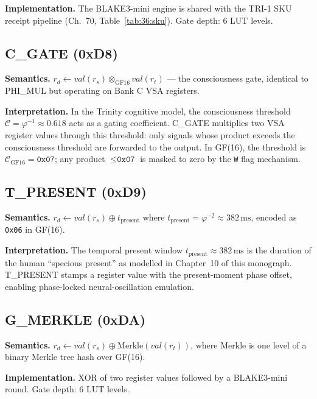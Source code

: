 \textbf{Implementation.} The BLAKE3-mini engine is shared with the
TRI-1 SKU receipt pipeline (Ch.~70, Table~\ref{tab:36:sku}).
Gate depth: 6 LUT levels.

\subsection{C\_GATE (0xD8)}
\label{subsec:71:c-gate}

\textbf{Semantics.} $r_d \leftarrow \mathit{val}(r_s) \otimes_{\mathrm{GF16}}
\mathit{val}(r_t)$ — the consciousness gate, identical to PHI\_MUL
but operating on Bank C VSA registers.

\textbf{Interpretation.} In the Trinity cognitive model, the
consciousness threshold $\mathcal{C} = \varphi^{-1} \approx 0.618$
acts as a gating coefficient.  C\_GATE multiplies two VSA register
values through this threshold: only signals whose product exceeds the
consciousness threshold are forwarded to the output.  In GF(16), the
threshold is $\mathcal{C}_{\mathrm{GF16}} = \texttt{0x07}$; any product
$\le \texttt{0x07}$ is masked to zero by the \texttt{W} flag mechanism.

\subsection{T\_PRESENT (0xD9)}
\label{subsec:71:t-present}

\textbf{Semantics.} $r_d \leftarrow \mathit{val}(r_s) \oplus
t_{\mathrm{present}}$ where $t_{\mathrm{present}} = \varphi^{-2} \approx 382\,\text{ms}$,
encoded as \texttt{0x06} in GF(16).

\textbf{Interpretation.} The temporal present window
$t_{\mathrm{present}} \approx 382\,\text{ms}$ is the duration of the
human ``specious present'' as modelled in Chapter~10 of this
monograph.  T\_PRESENT stamps a register value with the present-moment
phase offset, enabling phase-locked neural-oscillation emulation.

\subsection{G\_MERKLE (0xDA)}
\label{subsec:71:g-merkle}

\textbf{Semantics.} $r_d \leftarrow \mathit{val}(r_s) \oplus
\mathrm{Merkle}(\mathit{val}(r_t))$, where $\mathrm{Merkle}$ is one
level of a binary Merkle tree hash over GF(16).

\textbf{Implementation.} XOR of two register values followed by a
BLAKE3-mini round.  Gate depth: 6 LUT levels.

